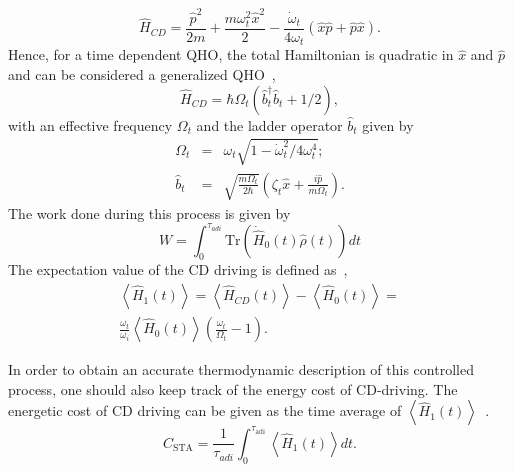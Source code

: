 \documentclass[aps,pra,twocolumn,showpacs,showkeys,groupedaddress,nobalancelastpage,nofootinbib,floatfix,superscriptaddress,longbibliography]{revtex4-2}
\begin{document}
\begin{equation}\label{qho.hcd.sta}
\hat{H}_{CD} = \frac{\hat{p}^2}{2m}+\frac{m\omega_t^2\hat{x}^2}{2} -\frac{\dot{\omega}_t}{4\omega_t} (\hat{x}\hat{p}+\hat{p}\hat{x}).
\end{equation}
Hence, for a time dependent QHO, the total Hamiltonian is quadratic in $\hat{x}$ and $\hat{p}$ and can be considered a generalized QHO~\cite{PhysRevE.96.012133},
\begin{equation}\label{eff.hamiltonian.cd}
\hat{H}_{CD} = \hbar \Omega_t(\hat{b}_t^{\dagger}\hat{b}_t + 1/2),
\end{equation}
with an effective frequency $\Omega_t$ and the ladder operator $\hat{b}_t$ given by
\begin{eqnarray}\label{eff.freq.lad}
  \Omega_t &=& \omega_t\sqrt{1-\dot{\omega}_t^2/4\omega_t^4}; \\
  \hat{b}_t &=& \sqrt{\frac{m\Omega_t}{2\hbar}}(\zeta_t \hat{x} + \frac{i\hat{p}}{m\Omega_t}).
\end{eqnarray}
The work done during this process is given by
\begin{equation}\label{work.adi}
W = \int_{0}^{\tau_{adi}}\text{Tr}(\dot{\hat{H}}_0(t) \hat{\rho}(t)) dt
\end{equation}
The expectation value of the CD driving is defined as~\cite{PhysRevE.98.032121},
\begin{multline}\label{exp.val.cd}
\left\langle \hat{H}_1(t) \right\rangle = \left\langle \hat{H}_{CD}(t) \right\rangle - \left\langle \hat{H}_0(t) \right\rangle=
\\ \frac{\omega_t}{\omega_i} \left\langle \hat{H}_0(t) \right\rangle \left(\frac{\omega_t}{\Omega_t}-1\right). 
\end{multline}

In order to obtain an accurate thermodynamic description of this controlled process, one should also keep track of the energy cost of CD-driving. The energetic cost of CD driving can be given as the time average of $\left\langle \hat{H}_1(t) \right\rangle$~\cite{PhysRevE.98.032121}.
\begin{equation}\label{sta.cost}
C_{\text{STA}} = \frac{1}{\tau_{adi}}\int_{0}^{\tau_{\text{adi}}} \left\langle \hat{H}_1(t) \right\rangle dt.
\end{equation}
\end{document}
